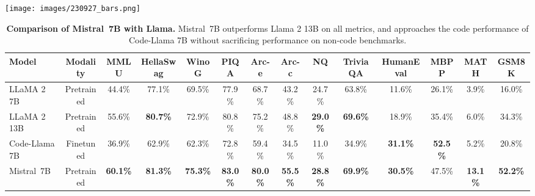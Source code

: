 \documentclass{article}
\def\llama{Llama\xspace}
\def\mistral{Mistral~7B\xspace}
\begin{document}
\begin{figure*}
\centering
\texttt{[image: images/230927\_bars.png]}
\caption{\small \textbf{Performance of \mistral and different \llama models on a wide range of benchmarks}. All models were re-evaluated on all metrics with our evaluation pipeline for accurate comparison. \mistral significantly outperforms \llama 2 7B and \llama 2 13B on all benchmarks. It is also vastly superior to \llama 1 34B in mathematics, code generation, and reasoning benchmarks.}
\label{fig:bars}
\end{figure*}

\setlength{\tabcolsep}{1.8pt}
\begin{table}
{\scriptsize
\centering
\begin{tabular}{@{}lccccccccccccc@{}}
\toprule
Model         & Modality   & MMLU            & HellaSwag       & WinoG      & PIQA            & Arc-e           & Arc-c           & NQ              & TriviaQA        & HumanEval       & MBPP            & MATH            & GSM8K           \\ \midrule
LLaMA 2 7B    & Pretrained & 44.4\%          & 77.1\%          & 69.5\%          & 77.9\%          & 68.7\%          & 43.2\%          & 24.7\%          & 63.8\%          & 11.6\%          & 26.1\%          & 3.9\%           & 16.0\%          \\
LLaMA 2 13B   & Pretrained & 55.6\%          & \textbf{80.7\%} & 72.9\%          & 80.8\%          & 75.2\%          & 48.8\%          & \textbf{29.0\%} & \textbf{69.6\%} & 18.9\%          & 35.4\%          & 6.0\%           & 34.3\%          \\ \midrule
Code-\llama 7B & Finetuned  & 36.9\%          & 62.9\%          & 62.3\%          & 72.8\%          & 59.4\%          & 34.5\%          & 11.0\%          & 34.9\%          & \textbf{31.1\%} & \textbf{52.5\%} & 5.2\%           & 20.8\%          \\ \midrule
\mistral    & Pretrained & \textbf{60.1\%} & \textbf{81.3\%} & \textbf{75.3\%} & \textbf{83.0\%} & \textbf{80.0\%} & \textbf{55.5\%} & \textbf{28.8\%} & \textbf{69.9\%} & \textbf{30.5\%} & 47.5\%          & \textbf{13.1\%} & \textbf{52.2\%} \\ \bottomrule
\end{tabular}
}
\vspace{4pt}
\caption{\small \textbf{Comparison of \mistral with \llama.} \mistral outperforms \llama 2 13B on all metrics, and approaches the code performance of Code-\llama 7B without sacrificing performance on non-code benchmarks.}
\label{tab:results}
\end{table}
\end{document}
